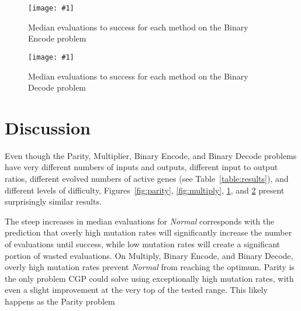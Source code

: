 \documentclass[runningheads,a4paper]{llncs}
\newcommand{\includegraphicsfit}[1]
{\texttt{[image: \#1]}}
\begin{document}
\begin{figure}
  \centering
  \includegraphicsfit{encode}
  \caption{Median evaluations to success for each method on the Binary Encode problem} 
  \label{fig:encode}
\end{figure}

\begin{figure}
  \centering
  \includegraphicsfit{decode}
  \caption{Median evaluations to success for each method on the Binary Decode problem} 
  \label{fig:decode}
\end{figure}

\section{Discussion}
Even though the Parity, Multiplier, Binary Encode, and Binary Decode problems have
very different numbers of inputs and outputs, different input to output ratios, 
different evolved numbers of active genes (see Table~\ref{table:results}), and
different levels of difficulty, Figures~\ref{fig:parity}, \ref{fig:multiply},
\ref{fig:encode}, and \ref{fig:decode} present surprisingly similar results.  
\begin{comment}
On all four
problems \emph{Normal} has a fairly clear quadratic shape which at its lowest point
approaches or sometimes crosses the line of \emph{Single}.  As the mutation rate increases
beyond the optimal value for \emph{Normal} all techniques except \emph{Single} share
very similar if not identical progressions.  Below \emph{Normal}'s optimal mutation
rate, \emph{Normal} gets significantly worse while \emph{Skip} and \emph{Accumulate}
diverge from \emph{Normal} by maintaining similar qualities as the optimal value.
At exceptionally low mutation rates \emph{Normal} takes over an order of magnitude
more evaluations to find success than all of the other techniques.

The shape of these features is as expected.
\end{comment}
  The steep increases in median evaluations
for \emph{Normal} corresponds with the prediction that overly high mutation rates will
significantly increase the number of evaluations until success, 
while low mutation rates will create a significant portion of
wasted evaluations.  On Multiply, Binary Encode, and Binary Decode, overly high mutation rates
prevent \emph{Normal} from reaching the optimum.
Parity is the only problem CGP could solve using exceptionally high mutation rates, with even
a slight improvement at the very top of the tested range.  This likely happens as the Parity problem
\end{document}
